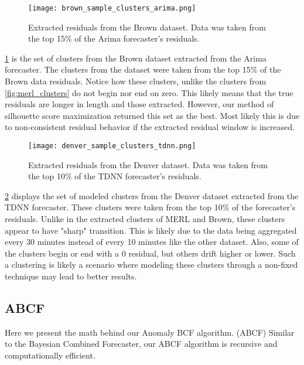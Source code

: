 \begin{figure}
	\begin{center}
		\texttt{[image: brown\_sample\_clusters\_arima.png]}
	\end{center}
	\caption{Extracted residuals from the Brown dataset.  Data was taken from the top 15\% of the Arima forecaster's residuals.}
	\label{fig:brown_clusters}
\end{figure}

\ref{fig:brown_clusters} is the set of clusters from the Brown dataset extracted from the Arima forecaster.  The clusters from the dataset were taken from the top 15\% of the Brown data residuals.  Notice how these clusters, unlike the clusters from \ref{fig:merl_clusters} do not begin nor end on zero.  This likely means that the true residuals are longer in length and those extracted.  However, our method of silhouette score maximization returned this set as the best.  Most likely this is due to non-consistent residual behavior if the extracted residual window is increased.
  
\begin{figure}
	\begin{center}
		\texttt{[image: denver\_sample\_clusters\_tdnn.png]}
	\end{center}
	\caption{Extracted residuals from the Denver dataset.  Data was taken from the top 10\% of the TDNN forecaster's residuals.}
	\label{fig:denver_clusters}
\end{figure}

\ref{fig:denver_clusters} displays the set of modeled clusters from the Denver dataset extracted from the TDNN forecaster.  These clusters were taken from the top 10\% of the forecaster's residuals.  Unlike in the extracted clusters of MERL and Brown, these clusters appear to have "sharp" transition.  This is likely due to the data being aggregated every 30 minutes instead of every 10 minutes like the other dataset.  Also, some of the clusters begin or end with a 0 residual, but others drift higher or lower.  Such a clustering is likely a scenario where modeling these clusters through a non-fixed technique may lead to better results.


\subsection{ABCF}
Here we present the math behind our Anomaly BCF algorithm. (ABCF)  Similar to the Bayesian Combined Forecaster, our ABCF algorithm is recursive and computationally efficient.  

